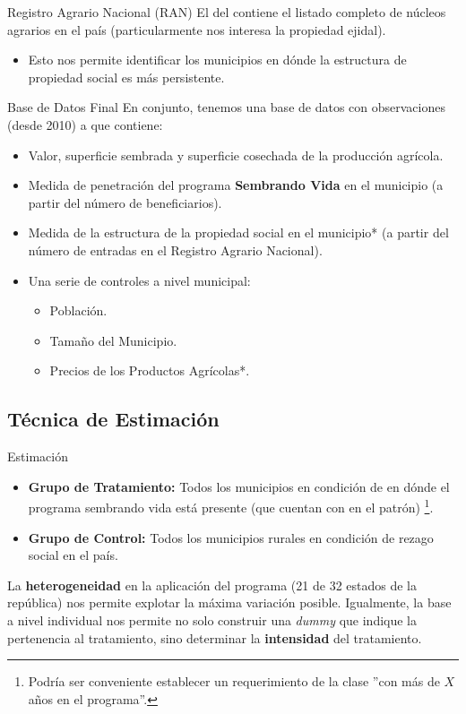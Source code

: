 \documentclass[10pt,usenames,dvipsnames]{beamer}
\begin{document}
\begin{frame}{Registro Agrario Nacional (RAN)}
El  del  contiene el listado completo de núcleos agrarios en el país (particularmente nos interesa la propiedad ejidal).\\
\bigskip
\begin{itemize}
\item Esto nos permite identificar los municipios en dónde la estructura de propiedad social es más persistente. 
\end{itemize}
\end{frame}

\begin{frame}{Base de Datos Final}
En conjunto, tenemos una base de datos con observaciones  (desde 2010) a  que contiene:
\begin{itemize}
\item Valor, superficie sembrada y superficie cosechada de la producción agrícola.
\item Medida de penetración del programa \textbf{Sembrando Vida} en el municipio (a partir del número de beneficiarios).
\item Medida de la estructura de la propiedad social en el municipio* (a partir del número de entradas en el Registro Agrario Nacional).
\item Una serie de controles a nivel municipal:
\begin{itemize}
\item Población.
\item Tamaño del Municipio.
\item Precios de los Productos Agrícolas*. 
\end{itemize}
\end{itemize}
\end{frame}


\subsection{Técnica de Estimación}

\begin{frame}{Estimación}
\begin{itemize}
\item \textbf{Grupo de Tratamiento:} Todos los municipios en condición de  en dónde el programa sembrando vida está presente (que cuentan con  en el patrón) \footnote{Podría ser conveniente establecer un requerimiento de la clase ''con más de $X$ años en el programa''.}.
\item \textbf{Grupo de Control:} Todos los municipios rurales en condición de rezago social en el país.
\end{itemize}
\bigskip
La \textbf{heterogeneidad} en la aplicación del programa (21 de 32 estados de la república) nos permite explotar la máxima variación posible. Igualmente, la base a nivel individual nos permite no solo construir una \textit{dummy} que indique la pertenencia al tratamiento, sino determinar la \textbf{intensidad} del tratamiento.
\end{frame}
\end{document}

